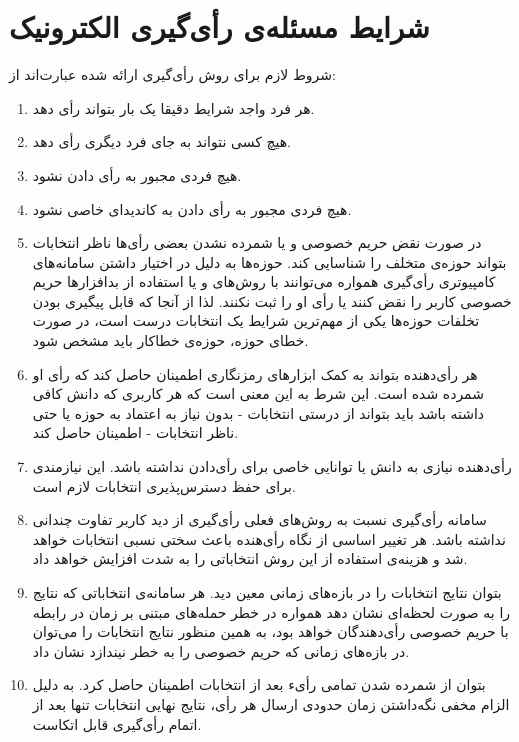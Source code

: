 \section{شرایط مسئله‌ی رأی‌گیری الکترونیک}
شروط لازم برای روش‌ رأی‌گیری ارائه شده عبارت‌اند از:  
\begin{enumerate}
	\item 
	هر فرد واجد شرایط دقیقا یک بار بتواند رأی دهد.
	\item 
	هیچ کسی نتواند به جای فرد دیگری رأی دهد.
	\item 
	هیچ فردی مجبور به رأی دادن نشود.
	\item 
	هیچ فردی مجبور به رأی دادن به کاندیدای خاصی نشود.
	\item 
	در صورت نقض حریم خصوصی و یا شمرده نشدن بعضی رأی‌ها ناظر انتخابات بتواند حوزه‌ی متخلف را شناسایی کند. حوزه‌ها به دلیل در اختیار داشتن سامانه‌های کامپیوتری رأی‌گیری همواره می‌توانند با روش‌های 
	و یا استفاده از بد‌افزار‌ها حریم خصوصی کاربر را نقض کنند یا رأی او را ثبت نکنند. لذا از آنجا که قابل پیگیری بودن تخلفات حوزه‌ها یکی از مهم‌ترین شرایط یک انتخابات درست است، در صورت خطای حوزه، حوزه‌ی خطاکار باید مشخص شود.
	\item 
	هر رأی‌دهنده بتواند به کمک ابزارهای رمزنگاری اطمینان حاصل کند که رأی او شمرده شده است. این شرط به این معنی است که هر کاربری که دانش کافی داشته باشد باید بتواند از درستی انتخابات - بدون نیاز به اعتماد به حوزه یا حتی ناظر انتخابات - اطمینان حاصل کند. 
	\item
	رأی‌دهنده نیازی به دانش یا توانایی خاصی برای رأی‌دادن نداشته باشد. این نیازمندی برای حفظ دسترس‌پذیری انتخابات لازم است.
	\item
	سامانه رأی‌گیری نسبت به روش‌های فعلی رأی‌گیری از دید کاربر تفاوت چندانی نداشته باشد. هر تغییر اساسی از نگاه رأی‌هنده باعث سختی نسبی انتخابات خواهد شد و هزینه‌ی  استفاده از این روش انتخاباتی را به شدت افزایش خواهد داد.
	\item 
	بتوان نتایج انتخابات را در بازه‌های زمانی معین دید. هر سامانه‌ی انتخاباتی که نتایج را به صورت لحظه‌ای نشان دهد همواره در خطر حمله‌های مبتنی بر زمان در رابطه با حریم خصوصی رأی‌دهندگان خواهد بود، به همین منظور نتایج انتخابات را می‌توان در بازه‌های زمانی که حریم خصوصی را به خطر نیندازد نشان داد.
	\item 
	بتوان از شمرده شدن تمامی رأیء بعد از انتخابات اطمینان حاصل کرد. به دلیل الزام مخفی نگه‌داشتن زمان حدودی ارسال هر رأی، نتایج نهایی انتخابات تنها بعد از اتمام رأی‌گیری قابل اتکاست.
\end{enumerate}

